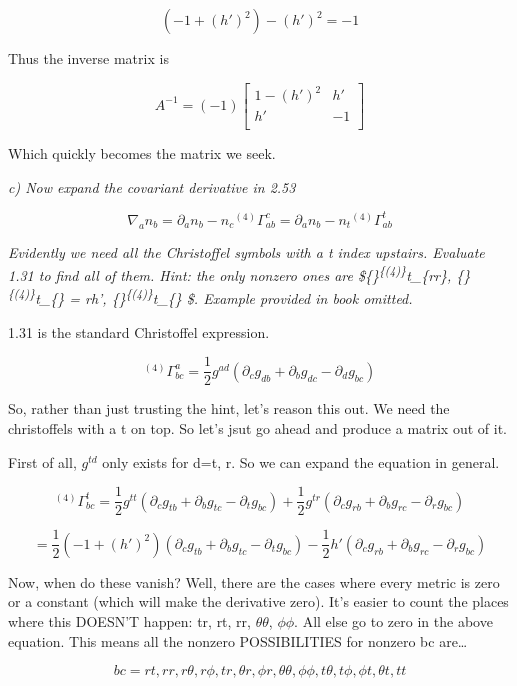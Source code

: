 \documentclass[landscape,letterpaper,10pt,english]{article}
\begin{document}
\[ (-1 + (h')^2) - (h')^2 = -1 \]

Thus the inverse matrix is

\[A^{-1} = (-1) \begin{bmatrix}
1-(h')^2 & h' \\
h' & -1 \\
\end{bmatrix}\]

Which quickly becomes the matrix we seek.

    \emph{c) Now expand the covariant derivative in 2.53}

\[\nabla_a n_b = \partial_a n_b - n_c {}^{(4)}\Gamma^c_{ab} = \partial_a n_b - n_t {}^{(4)} \Gamma^t_{ab}\]

\emph{Evidently we need all the Christoffel symbols with a t index
upstairs. Evaluate 1.31 to find all of them. Hint: the only nonzero ones
are \$\{\}\textsuperscript{\{(4)\}\Gamma}t\_\{rr\},
\{\}\textsuperscript{\{(4)\}\Gamma}t\_\{\theta\theta\} = rh',
\{\}\textsuperscript{\{(4)\}\Gamma}t\_\{\phi\phi\} \$. Example provided
in book omitted.}

    1.31 is the standard Christoffel expression.

\[ {}^{(4)}\Gamma^a_{bc} = \frac12 g^{ad}(\partial_c g_{db} + \partial_b g_{dc} - \partial_d g_{bc}) \]

    So, rather than just trusting the hint, let's reason this out. We need
the christoffels with a t on top. So let's jsut go ahead and produce a
matrix out of it.

First of all, \(g^{td}\) only exists for d=t, r. So we can expand the
equation in general.

\[ {}^{(4)}\Gamma^t_{bc} = \frac12 g^{tt}(\partial_c g_{tb} + \partial_b g_{tc} - \partial_t g_{bc}) + \frac12 g^{tr}(\partial_c g_{rb} + \partial_b g_{rc} - \partial_r g_{bc}) \]

\[  = \frac12 (-1+(h')^2) (\partial_c g_{tb} + \partial_b g_{tc} - \partial_t g_{bc}) - \frac12 h'(\partial_c g_{rb} + \partial_b g_{rc} - \partial_r g_{bc}) \]

    Now, when do these vanish? Well, there are the cases where every metric
is zero or a constant (which will make the derivative zero). It's easier
to count the places where this DOESN'T happen: tr, rt, rr,
\(\theta\theta\), \(\phi\phi\). All else go to zero in the above
equation. This means all the nonzero POSSIBILITIES for nonzero bc
are\ldots{}

\[ bc = rt, rr, r\theta, r\phi, tr, \theta r, \phi r, \theta\theta, \phi\phi, t \theta, t \phi, \phi t, \theta t, tt \]
\end{document}
